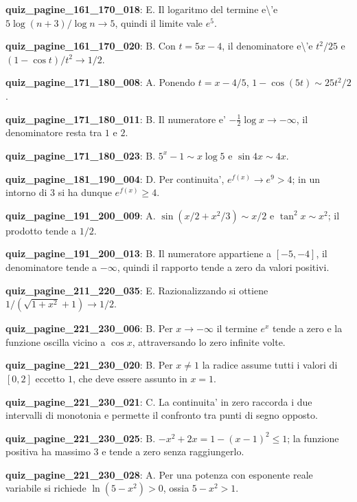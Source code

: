 \documentclass[11pt,a4paper]{article}
\newcounter{quiz}
\begin{document}
\noindent\textbf{quiz\_pagine\_161\_170\_018}: E. Il logaritmo del termine e\textbackslash{}'e $5\log(n+3)/\log n\to5$, quindi il limite vale $e^5$.\par\medskip
\noindent\textbf{quiz\_pagine\_161\_170\_020}: B. Con $t=5x-4$, il denominatore e\textbackslash{}'e $t^2/25$ e $(1-\cos t)/t^2\to1/2$.\par\medskip
\noindent\textbf{quiz\_pagine\_171\_180\_008}: A. Ponendo $t=x-4/5$, $1-\cos(5t)\sim25t^2/2$.\par\medskip
\noindent\textbf{quiz\_pagine\_171\_180\_011}: B. Il numeratore e' $-\frac12\log x\to-\infty$, il denominatore resta tra $1$ e $2$.\par\medskip
\noindent\textbf{quiz\_pagine\_171\_180\_023}: B. $5^x-1\sim x\log5$ e $\sin4x\sim4x$.\par\medskip
\noindent\textbf{quiz\_pagine\_181\_190\_004}: D. Per continuita', $e^{f(x)}\to e^9>4$; in un intorno di $3$ si ha dunque $e^{f(x)}\geq4$.\par\medskip
\noindent\textbf{quiz\_pagine\_191\_200\_009}: A. $\sin(x/2+x^2/3)\sim x/2$ e $\tan^2x\sim x^2$; il prodotto tende a $1/2$.\par\medskip
\noindent\textbf{quiz\_pagine\_191\_200\_013}: B. Il numeratore appartiene a $[-5,-4]$, il denominatore tende a $-\infty$, quindi il rapporto tende a zero da valori positivi.\par\medskip
\noindent\textbf{quiz\_pagine\_211\_220\_035}: E. Razionalizzando si ottiene $1/(\sqrt{1+x^2}+1)\to1/2$.\par\medskip
\noindent\textbf{quiz\_pagine\_221\_230\_006}: B. Per $x\to-\infty$ il termine $e^x$ tende a zero e la funzione oscilla vicino a $\cos x$, attraversando lo zero infinite volte.\par\medskip
\noindent\textbf{quiz\_pagine\_221\_230\_020}: B. Per $x\neq1$ la radice assume tutti i valori di $[0,2]$ eccetto $1$, che deve essere assunto in $x=1$.\par\medskip
\noindent\textbf{quiz\_pagine\_221\_230\_021}: C. La continuita' in zero raccorda i due intervalli di monotonia e permette il confronto tra punti di segno opposto.\par\medskip
\noindent\textbf{quiz\_pagine\_221\_230\_025}: B. $-x^2+2x=1-(x-1)^2\leq1$; la funzione positiva ha massimo $3$ e tende a zero senza raggiungerlo.\par\medskip
\noindent\textbf{quiz\_pagine\_221\_230\_028}: A. Per una potenza con esponente reale variabile si richiede $\ln(5-x^2)>0$, ossia $5-x^2>1$.\par\medskip
\end{document}
